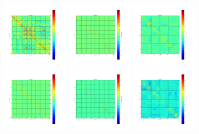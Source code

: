\begin{figure}[ht]
\begin{center}
\includegraphics[width=0.3\textwidth]{Figures/DarkTests/corrmat_TOI_CM_array_3_20161211s299.pdf}
\includegraphics[width=0.3\textwidth]{Figures/DarkTests/corrmat_TOI_PCA_array_1_20161211s299.pdf}
\includegraphics[width=0.3\textwidth]{Figures/DarkTests/corrmat_TOI_PCA_array_2_20161211s299.pdf}
\includegraphics[width=0.3\textwidth]{Figures/DarkTests/corrmat_TOI_PCA_array_3_20161211s299.pdf}
\includegraphics[width=0.3\textwidth]{Figures/DarkTests/corrmat_TOI_BC_array_1_20161211s299.pdf}
\includegraphics[width=0.3\textwidth]{Figures/DarkTests/corrmat_TOI_BC_array_2_20161211s299.pdf}

\end{center}
\end{figure}
